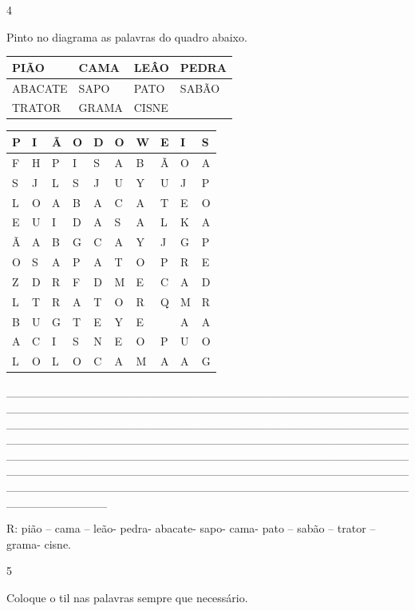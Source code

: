 {{\num{4}

Pinto no diagrama as palavras do quadro abaixo.


\begin{longtable}[]{@{}llll@{}}
\toprule
PIÃO & CAMA & LEÂO & PEDRA\tabularnewline
\midrule
\endhead
ABACATE & SAPO & PATO & SABÃO\tabularnewline
TRATOR & GRAMA & CISNE\tabularnewline
\bottomrule
\end{longtable}

\begin{longtable}[]{@{}llllllllll@{}}
\toprule
P & I & Ã & O & D & O & W & E & I & S\tabularnewline
\midrule
\endhead
F & H & P & I & S & A & B & Ã & O & A\tabularnewline
S & J & L & S & J & U & Y & U & J & P\tabularnewline
L & O & A & B & A & C & A & T & E & O\tabularnewline
E & U & I & D & A & S & A & L & K & A\tabularnewline
Ã & A & B & G & C & A & Y & J & G & P\tabularnewline
O & S & A & P & A & T & O & P & R & E\tabularnewline
Z & D & R & F & D & M & E & C & A & D\tabularnewline
L & T & R & A & T & O & R & Q & M & R\tabularnewline
B & U & G & T & E & Y & E & & A & A\tabularnewline
A & C & I & S & N & E & O & P & U & O\tabularnewline
L & O & L & O & C & A & M & A & A & G\tabularnewline
\bottomrule
\end{longtable}

\_\_\_\_\_\_\_\_\_\_\_\_\_\_\_\_\_\_\_\_\_\_\_\_\_\_\_\_\_\_\_\_\_\_\_\_\_\_\_\_\_\_\_\_\_\_\_\_\_\_\_\_\_\_\_\_\_\_\_\_\_\_\_\_\_\_\_\_\_\_\_\_\_\_\_\_\_\_\_\_\_\_\_\_\_\_\_\_\_\_\_\_\_\_\_\_\_\_\_\_\_\_\_\_\_\_\_\_\_\_\_\_\_\_\_\_\_\_\_\_\_\_\_\_\_\_\_\_\_\_\_\_\_\_\_\_\_\_\_\_\_\_\_\_\_\_\_\_\_\_\_\_\_\_\_\_\_\_\_\_\_\_\_\_\_\_\_\_\_\_\_\_\_\_\_\_\_\_\_\_\_\_\_\_\_\_\_\_\_\_\_\_\_\_\_\_\_\_\_\_\_\_\_\_\_\_\_\_\_\_\_\_\_\_\_\_\_\_\_\_\_\_\_\_\_\_\_\_\_\_\_\_\_\_\_\_\_\_\_\_\_\_\_\_\_\_\_\_\_\_\_\_\_\_\_\_\_\_\_\_\_\_\_\_\_\_\_\_\_\_\_\_\_\_\_\_\_\_\_\_\_\_\_\_\_\_\_\_\_\_\_\_\_\_\_\_\_\_\_\_\_\_\_\_\_\_\_\_\_\_\_\_\_\_\_\_\_\_\_\_\_\_\_\_\_\_\_\_\_\_\_\_\_\_\_\_\_\_\_\_\_\_\_\_\_\_\_\_

R: pião -- cama -- leão- pedra- abacate- sapo- cama- pato -- sabão --
trator -- grama- cisne.

\num{5}

Coloque o til nas palavras sempre que necessário.


}}
